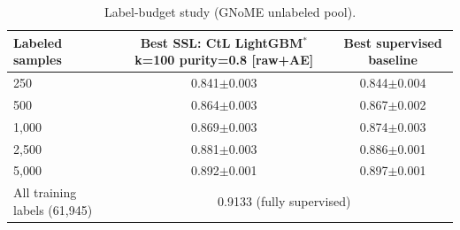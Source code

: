 \begin{table}[H]
\centering\small
\begin{tabular}{lcc}
\toprule
Labeled samples & Best SSL: CtL LightGBM$^*$ k=100 purity=0.8 [raw+AE] & Best supervised baseline\\
\midrule
250 & 0.841$\pm$0.003 & 0.844$\pm$0.004 \\
500 & 0.864$\pm$0.003 & 0.867$\pm$0.002 \\
1,000 & 0.869$\pm$0.003 & 0.874$\pm$0.003 \\
2,500 & 0.881$\pm$0.003 & 0.886$\pm$0.001 \\
5,000 & 0.892$\pm$0.001 & 0.897$\pm$0.001 \\
\midrule
All training labels (61,945) & \multicolumn{2}{c}{0.9133 (fully supervised)}\\
\bottomrule
\end{tabular}
\caption*{Label-budget study (GNoME unlabeled pool).}
\end{table}
